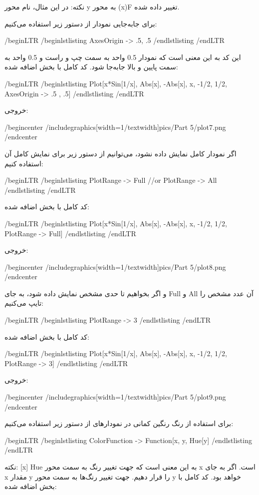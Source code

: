 نکته: در این مثال، نام محور y به محور (x)F تغییر داده شده.

برای جابه‌جایی نمودار از دستور زیر استفاده می‌کنیم:

/begin{LTR}
/begin{lstlisting}
AxesOrigin -> {.5, .5}
/end{lstlisting}
/end{LTR}

این کد به این معنی است که نمودار 0.5 واحد به سمت چپ و راست و 0.5 واحد به سمت پایین و بالا جابه‌جا شود.
کد کامل با بخش اضافه شده:

/begin{LTR}
/begin{lstlisting}
Plot[{x*Sin[1/x], Abs[x], -Abs[x]}, {x, -1/2, 1/2}, 
 AxesOrigin -> {.5 , .5}]
/end{lstlisting}
/end{LTR}

خروجی:

/begin{center}
/includegraphics[width=1/textwidth]{pics/Part 5/plot7.png}
/end{center}

اگر نمودار کامل نمایش داده نشود، می‌توانیم از دستور زیر برای نمایش کامل آن استفاده کنیم:

/begin{LTR}
/begin{lstlisting}
PlotRange -> Full
//or
PlotRange -> All
/end{lstlisting}
/end{LTR}

کد کامل با بخش اضافه شده:

/begin{LTR}
/begin{lstlisting}
Plot[{x*Sin[1/x], Abs[x], -Abs[x]}, {x, -1/2, 1/2}, PlotRange -> Full]
/end{lstlisting}
/end{LTR}

خروجی:

/begin{center}
/includegraphics[width=1/textwidth]{pics/Part 5/plot8.png}
/end{center}

و اگر بخواهیم تا حدی مشخص نمایش داده شود، به جای Full و All آن عدد مشخص را تایپ می‌کنیم:

/begin{LTR}
/begin{lstlisting}
PlotRange -> 3
/end{lstlisting}
/end{LTR}

کد کامل با بخش اضافه شده:

/begin{LTR}
/begin{lstlisting}
Plot[{x*Sin[1/x], Abs[x], -Abs[x]}, {x, -1/2, 1/2}, PlotRange -> 3]
/end{lstlisting}
/end{LTR}

خروجی:

/begin{center}
/includegraphics[width=1/textwidth]{pics/Part 5/plot9.png}
/end{center}

برای استفاده از رنگ رنگین کمانی در نمودار‌های از دستور زیر استفاده می‌کنیم:

/begin{LTR}
/begin{lstlisting}
ColorFunction -> Function[{x, y}, Hue[y]
/end{lstlisting}
/end{LTR}

نکته: [x] Hue به این معنی است که جهت تغییر رنگ به سمت محور x است. اگر به جای x مقدار y را قرار دهیم. جهت تغییر رنگ‌ها به سمت محور y خواهد بود.
کد کامل با بخش اضافه شده:

